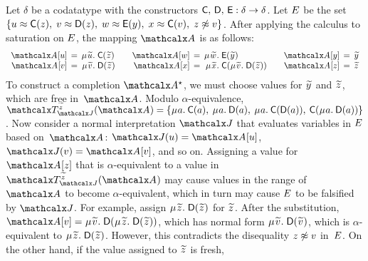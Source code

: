 \begin{examplex}
Let $\delta$ be a codatatype with the constructors $\textsf{C},\, \textsf{D},\, \textsf{E} :\delta \rightarrow \delta$.
Let $E$ be the set
$\{
u \approx \textsf{C}( z ),\;
v \approx \textsf{D}( z ),\;
w \approx \textsf{E}( y ),\;
x \approx \textsf{C}( v ),\;
z \not\approx v
\}$.
After applying the calculus to saturation on $E$,
the mapping $\Val$ is as follows:
\[\begin{array}{r@{}c@{}r@{}l@{\qquad}r@{}c@{}r@{}l@{\qquad}r@{}c@{}l}
\Val \ec{u} & {}\,=\,{} & \MU {\Varec{u}}.\; & \const{C}( {\Varec{z}} ) &
\Val \ec{w} & = & \MU {\Varec{w}}.\; & \const{E}( {\Varec{y}} ) &
\Val \ec{y} & {}\,=\,{} & {\Varec{y}} \\
\Val \ec{v} & = & \MU {\Varec{v}}.\; & \const{D}( {\Varec{z}} ) &
\Val \ec{x} & {}\,=\,{} & \MU {\Varec{x}}.\; & \const{C}( \MU {\Varec{v}}.\; \const{D}( {\Varec{z}} ) ) &
\Val \ec{z} & = & {\Varec{z}}
\end{array}\]
%
To construct a completion $\ValC$, we must choose values for ${\Varec{y}}$ and ${\Varec{z}}$,
which are free in~$\Val$.
Modulo $\alpha$-equivalence, $\smash{\Terms_{\smash{\J}}^{{\Varec{z}}}( \Val )} =
\{
\MU a.\: \const{C}( a ),\:
\MU a.\: \const{D}( a ),\allowbreak\:
\MU a.\: \const{C}( \const{D}( a )),\allowbreak\:
\const{C}( \MU a.\: \const{D}( a ))
\}
$.
Now consider a normal interpretation $\J$ that evaluates variables in $E$ based on~$\Val$:
$\interp{\J}{u} = \Val \ec{u}$, $\interp{\J}{v} = \Val \ec{v}$, and so on.
Assigning a value for $\Val \ec{z}$ that is $\alpha$-equivalent to a value in $\Terms_{\smash{\J}}^{{\Varec{z}}}( \Val )$
may cause values in the range of $\Val$ to become $\alpha$-equivalent,
which in turn may cause $E$ to be falsified by $\J$.
For example, assign $\MU {\Varec{z}}.\; \const{D}( {\Varec{z}} )$ for ${\Varec{z}}$.
After the substitution, $\Val \ec{v} = \MU {\Varec{v}}.\; \const{D}( \MU {\Varec{z}}.\; \const{D}( {\Varec{z}} ) )$,
which has normal form $\MU {\Varec{v}}.\; \const{D}( {\Varec{v}} )$,
which is $\alpha$-equivalent to $\MU {\Varec{z}}.\; \const{D}( {\Varec{z}} )$.
However, this contradicts the disequality $z \not\approx v$ in~$E$.
On the other hand, if the value assigned to ${\Varec{z}}$ is fresh, %

\end{examplex}
